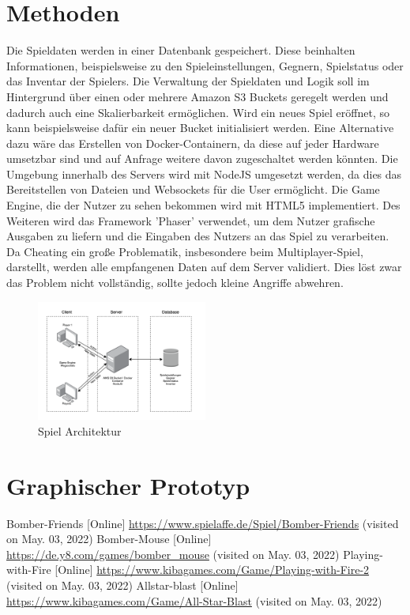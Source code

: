 \documentclass[conference]{IEEEtran}
\begin{document}
\section{Methoden}
Die Spieldaten werden in einer Datenbank gespeichert. Diese beinhalten Informationen, beispielsweise zu den Spieleinstellungen, Gegnern, Spielstatus oder das Inventar der Spielers. 
Die Verwaltung der Spieldaten und Logik soll im Hintergrund über einen oder mehrere Amazon S3 Buckets geregelt werden und dadurch auch eine Skalierbarkeit ermöglichen. Wird ein neues Spiel eröffnet, so kann beispielsweise dafür ein neuer Bucket initialisiert werden. Eine Alternative dazu wäre das Erstellen von Docker-Containern, da diese auf jeder Hardware umsetzbar sind und auf Anfrage weitere davon zugeschaltet werden könnten. Die Umgebung innerhalb des Servers wird mit NodeJS umgesetzt werden, da dies das Bereitstellen von Dateien und Websockets für die User ermöglicht. 
Die Game Engine, die der Nutzer zu sehen bekommen wird mit HTML5 implementiert. Des Weiteren wird das Framework 'Phaser' verwendet, um dem Nutzer grafische Ausgaben zu liefern und die Eingaben des Nutzers an das Spiel zu verarbeiten.
Da Cheating ein große Problematik, insbesondere beim Multiplayer-Spiel, darstellt, werden alle empfangenen Daten auf dem Server validiert. Dies löst zwar das Problem nicht vollständig, sollte jedoch kleine Angriffe abwehren. 
\begin{figure}[H]
    \centering
    \includegraphics[width=0.5\textwidth]{res/game_arch.png}
    \caption{Spiel Architektur}
\end{figure}

\section{Graphischer Prototyp}


\begin{thebibliography}{0}
	Bomber-Friends [Online] \url{https://www.spielaffe.de/Spiel/Bomber-Friends} (visited on May. 03, 2022)
	Bomber-Mouse [Online] \url{https://de.y8.com/games/bomber_mouse} (visited on May. 03, 2022)
	Playing-with-Fire [Online] \url{https://www.kibagames.com/Game/Playing-with-Fire-2 } (visited on May. 03, 2022)
	Allstar-blast [Online] \url{https://www.kibagames.com/Game/All-Star-Blast} (visited on May. 03, 2022)

\end{thebibliography}
\vspace{12pt}
\end{document}
